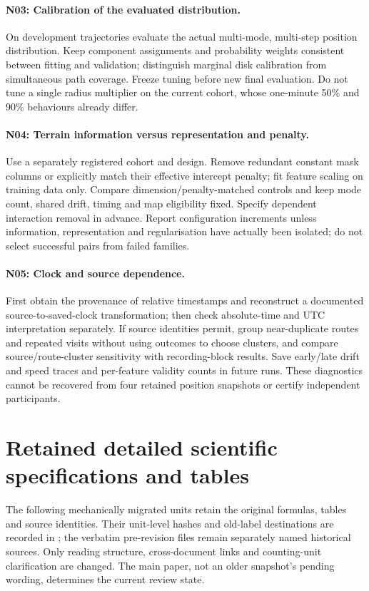 \paragraph{N03: Calibration of the evaluated distribution.}
On development trajectories evaluate the actual multi-mode, multi-step
position distribution. Keep component assignments and probability weights
consistent between fitting and validation; distinguish marginal disk
calibration from simultaneous path coverage. Freeze tuning before new final
evaluation. Do not tune a single radius multiplier on the current cohort,
whose one-minute 50\% and 90\% behaviours already differ.
\paragraph{N04: Terrain information versus representation and penalty.}
Use a separately registered cohort and design. Remove redundant constant
mask columns or explicitly match their effective intercept penalty; fit
feature scaling on training data only. Compare dimension/penalty-matched
controls and keep mode count, shared drift, timing and map eligibility fixed.
Specify dependent interaction removal in advance. Report configuration
increments unless information, representation and regularisation have
actually been isolated; do not select successful pairs from failed families.
\paragraph{N05: Clock and source dependence.}
First obtain the provenance of relative timestamps and reconstruct a
documented source-to-saved-clock transformation; then check absolute-time
and UTC interpretation separately. If source identities permit, group
near-duplicate routes and repeated visits without using outcomes to choose
clusters, and compare source/route-cluster sensitivity with recording-block
results. Save early/late drift and speed traces and per-feature validity
counts in future runs. These diagnostics cannot be recovered from four
retained position snapshots or certify independent participants.

\section{Retained detailed scientific specifications and tables}
The following mechanically migrated units retain the original formulas,
tables and source identities. Their unit-level hashes and old-label
destinations are recorded in ;
the verbatim pre-revision files remain separately named historical sources.
Only reading structure, cross-document links and counting-unit clarification
are changed. The main paper, not an older snapshot's pending wording,
determines the current review state.



